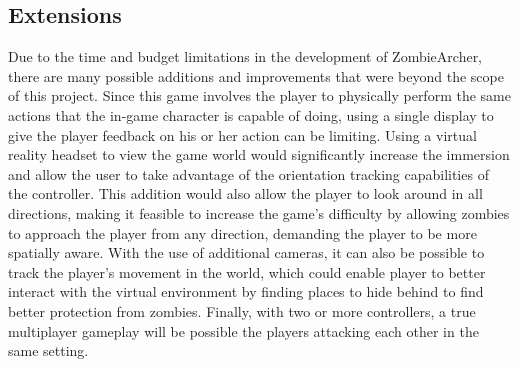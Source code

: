 \documentclass[titlepage, 12pt]{scrartcl}
\begin{document}
    \subsection{Extensions}
    Due to the time and budget limitations in the development of ZombieArcher, there are many possible additions and improvements that were beyond the scope of this project. Since this game involves the player to physically perform the same actions that the in-game character is capable of doing, using a single display to give the player feedback on his or her action can be limiting. Using a virtual reality headset to view the game world would significantly increase the immersion and allow the user to take advantage of the orientation tracking capabilities of the controller. This addition would also allow the player to look around in all directions, making it feasible to increase the game's difficulty by allowing zombies to approach the player from any direction, demanding the player to be more spatially aware. With the use of additional cameras, it can also be possible to track the player's movement in the world, which could enable player to better interact with the virtual environment by finding places to hide behind to find better protection from zombies. Finally, with two or more controllers, a true multiplayer gameplay will be possible the players attacking each other in the same setting. \par


\nocite{*}
\end{document}
